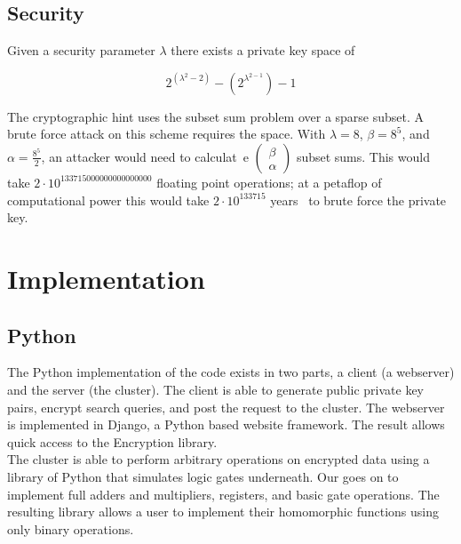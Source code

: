 \documentclass[letterpaper,11pt]{article} %
\begin{document}
\subsection*{Security}
Given a security parameter \(\lambda\) there exists a private key space of

\[2^{(\lambda^2-2)} - (2^{\lambda^{2-1}})-1\]

The cryptographic hint uses the subset sum problem over a sparse subset. A brute force attack on this scheme requires the space. With \(\lambda = 8\), \(\beta  = 8^5\), and \(\alpha = \frac{8^5}{2}\), an attacker would need to calculat\
e \(\left(\begin{matrix}\beta\\\alpha\end{matrix}\right)\) subset sums. This would take \(2\cdot 10^{133715000000000000000}\) floating point operations; at a petaflop of computational power this would take \(2\cdot 10^{133715}\) years \
to brute force the private key.



\section*{Implementation}
\subsection*{Python}
The Python implementation of the code exists in two parts, a client (a webserver) and the server (the cluster). The client is able to generate public private key pairs, encrypt search queries, and post the request to the cluster. The webserver is implemented in Django, a Python based website framework. The result allows quick access to the Encryption library.\\

The cluster is able to perform arbitrary operations on encrypted data using a library of Python that simulates logic gates underneath. Our goes on to implement full adders and multipliers, registers, and basic gate operations. The resulting library allows a user to implement their homomorphic functions using only binary operations.\\
\end{document}
